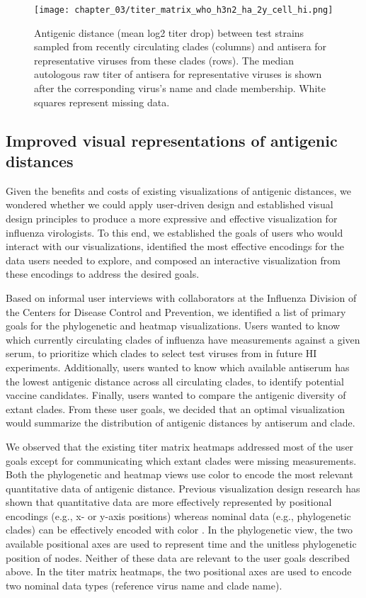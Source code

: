 \begin{figure}
  \centering
  \texttt{[image: chapter\_03/titer\_matrix\_who\_h3n2\_ha\_2y\_cell\_hi.png]}
  \caption{\label{fig:titer-matrix} Antigenic distance (mean log2 titer drop) between test strains sampled from recently circulating clades (columns) and antisera for representative viruses from these clades (rows).
    The median autologous raw titer of antisera for representative viruses is shown after the corresponding virus's name and clade membership.
    White squares represent missing data.}
\end{figure}

\subsection{Improved visual representations of antigenic distances}

Given the benefits and costs of existing visualizations of antigenic distances, we wondered whether we could apply user-driven design and established visual design principles to produce a more expressive and effective visualization for influenza virologists.
To this end, we established the goals of users who would interact with our visualizations, identified the most effective encodings for the data users needed to explore, and composed an interactive visualization from these encodings to address the desired goals.

Based on informal user interviews with collaborators at the Influenza Division of the Centers for Disease Control and Prevention, we identified a list of primary goals for the phylogenetic and heatmap visualizations.
Users wanted to know which currently circulating clades of influenza have measurements against a given serum, to prioritize which clades to select test viruses from in future HI experiments.
Additionally, users wanted to know which available antiserum has the lowest antigenic distance across all circulating clades, to identify potential vaccine candidates.
Finally, users wanted to compare the antigenic diversity of extant clades.
From these user goals, we decided that an optimal visualization would summarize the distribution of antigenic distances by antiserum and clade.

We observed that the existing titer matrix heatmaps addressed most of the user goals except for communicating which extant clades were missing measurements.
Both the phylogenetic and heatmap views use color to encode the most relevant quantitative data of antigenic distance.
Previous visualization design research has shown that quantitative data are more effectively represented by positional encodings (e.g., x- or y-axis positions) whereas nominal data (e.g., phylogenetic clades) can be effectively encoded with color \citep{Mackinlay1986}.
In the phylogenetic view, the two available positional axes are used to represent time and the unitless phylogenetic position of nodes.
Neither of these data are relevant to the user goals described above.
In the titer matrix heatmaps, the two positional axes are used to encode two nominal data types (reference virus name and clade name).

